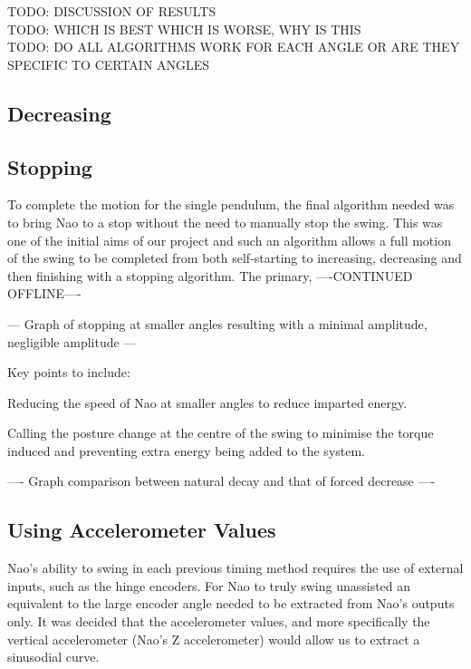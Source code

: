 \documentclass[11pt]{article}
\newcommand*\ruleline[1]{\par\noindent\raisebox{.8ex}{\makebox[\linewidth]{\hrulefill\hspace{1ex}\raisebox{-.8ex}{#1}\hspace{1ex}\hrulefill}}}
\begin{document}
TODO: DISCUSSION OF RESULTS\\
TODO: WHICH IS BEST WHICH IS WORSE, WHY IS THIS\\
TODO: DO ALL ALGORITHMS WORK FOR EACH ANGLE OR ARE THEY SPECIFIC TO CERTAIN ANGLES\\

\clearpage

\subsection{Decreasing}


\subsection{Stopping}
\ruleline{David Thomas}
To complete the motion for the single pendulum, the final algorithm needed was to bring Nao to a stop without the need to manually stop the swing. This was one of the initial aims of our project and such an algorithm allows a full motion of the swing to be completed from both self-starting to increasing, decreasing and then finishing with a stopping algorithm. The primary, ----CONTINUED OFFLINE----

--- Graph of stopping at smaller angles resulting with a minimal amplitude, negligible amplitude ---

Key points to include:

Reducing the speed of Nao at smaller angles to reduce imparted energy.

Calling the posture change at the centre of the swing to minimise the torque induced and preventing extra energy being added to the system.

 ---- Graph comparison between natural decay and that of forced decrease ----

\subsection{Using Accelerometer Values}
\ruleline{George Sheppard}
Nao's ability to swing in each previous timing method requires the use of external inputs, such as the hinge encoders. For Nao to truly swing unassisted an equivalent to the large encoder angle needed to be extracted from Nao's outputs only. It was decided that the accelerometer values, and more specifically the vertical accelerometer (Nao's Z accelerometer) would allow us to extract a sinusodial curve.\\
\end{document}
